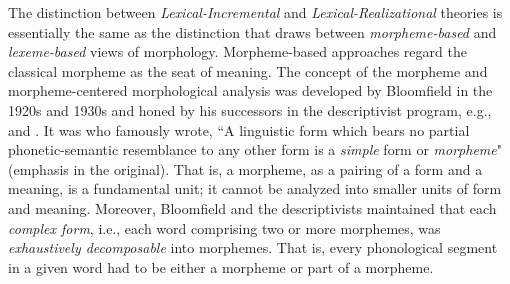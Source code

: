 The distinction between \emph{Lexical-Incremental} 
and \emph{Lexical-Realizational} 
theories is essentially the same as the distinction 
that \cite{aronoff:1994} draws
between \emph{morpheme-based} and \emph{lexeme-based} 
views of morphology. Morpheme-based approaches regard 
the classical morpheme 
as the seat of meaning. %
The concept of the morpheme and morpheme-centered morphological analysis
was developed by Bloomfield in the 1920s and 1930s 
\citep{bloomfield:1926, bloomfield:1933} and honed by his 
successors in the descriptivist program, e.g., %
\cite{hockett:1947} and \cite{harris:1955}.
It was \cite[][p. 161]{bloomfield:1933} who famously wrote, ``A linguistic form 
which bears no partial phonetic-semantic resemblance to any other form is a \emph{simple} form or \emph{morpheme}" (emphasis in the original). 
That is, a morpheme, as a pairing of a form and a meaning, is a fundamental unit; it cannot be analyzed into smaller units
of form and meaning.
Moreover, Bloomfield and the descriptivists maintained that
each \emph{complex form}, i.e., each word comprising two or more morphemes, was
\emph{exhaustively decomposable} into morphemes. That is, every phonological segment
in a given word had to be either a morpheme or part of a morpheme. 



